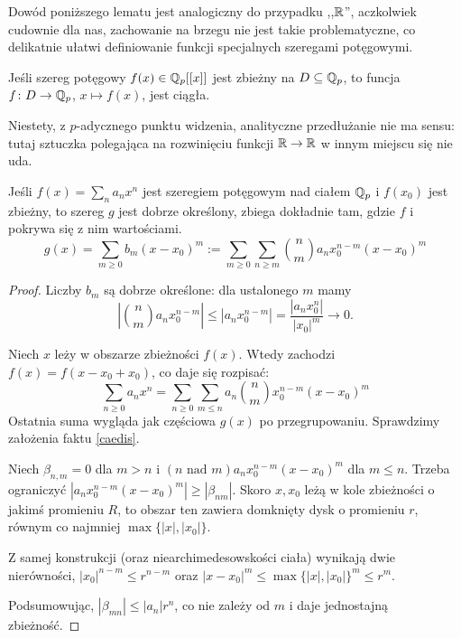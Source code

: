 Dowód  poniższego lematu jest analogiczny do przypadku ,,$\mathbb R$'', aczkolwiek cudownie dla nas, zachowanie na brzegu nie jest takie problematyczne, co delikatnie ułatwi definiowanie funkcji specjalnych szeregami potęgowymi.

\begin{lemat} \label{stummeschreie}
	Jeśli szereg potęgowy $f(x) \in \mathbb Q_p[[x]]$ jest zbieżny na $D \subseteq \mathbb Q_p$, to funcja $f \colon D \to \mathbb Q_p$, $x \mapsto f(x)$, jest ciągła.
\end{lemat}

Niestety, z $p$-adycznego punktu widzenia, analityczne przedłużanie nie ma sensu: tutaj sztuczka polegająca na rozwinięciu funkcji $\mathbb R \to \mathbb R$ w innym miejscu się nie uda.

\begin{fakt}
	Jeśli $f(x) = \sum_n a_n x^n$ jest szeregiem potęgowym nad ciałem $\mathbb Q_p$ i $f(x_0)$ jest zbieżny, to szereg $g$ jest dobrze określony, zbiega dokładnie tam, gdzie $f$ i pokrywa się z nim wartościami.
	\[
		g(x) = \sum_{m \ge 0} b_m (x - x_0)^m := \sum_{m \ge 0} \sum_{n \ge m} {n \choose m} a_n x_0^{n-m} (x-x_0)^m
	\]
\end{fakt}

\begin{proof}
	Liczby $b_m$ są dobrze określone: dla ustalonego $m$ mamy
	\[
		\left|{n \choose m} a_n x_0^{n-m}\right| \le |a_n x_0^{n-m}| = \frac{|a_nx_0^n|}{|x_0|^m} \to 0.
	\]

	Niech $x$ leży w obszarze zbieżności $f(x)$.
	Wtedy zachodzi $f(x) = f(x - x_0 + x_0)$, co daje się rozpisać:
	\[
		\sum_{n \ge 0} a_n x^n = \sum_{n \ge 0} \sum_{m \le n} a_n  {n \choose m} x_0^{n-m} (x-x_0)^m
	\]
	Ostatnia suma wygląda jak częściowa $g(x)$ po przegrupowaniu.
	Sprawdzimy założenia faktu \ref{caedis}.

	Niech $\beta_{n, m} = 0$ dla $m > n$ i $(n \textrm{ nad } m )a_n x_0^{n-m}(x - x_0)^m$ dla $m \le n$.
	Trzeba ograniczyć $|a_n x_0^{n-m} (x - x_0)^m| \ge |\beta_{nm}|$.
	Skoro $x, x_0$ leżą w kole zbieżności o jakimś promieniu $R$, to obszar ten zawiera domknięty dysk o promieniu $r$, równym co najmniej $\max \{|x|, |x_0|\}$.

	Z samej konstrukcji (oraz niearchimedesowskości ciała) wynikają dwie nierówności, $|x_0|^{n-m} \le r^{n-m}$ oraz $|x - x_0|^m \le \max \{|x|, |x_0|\}^m \le r^m$.

	Podsumowując, $|\beta_{mn}| \le |a_n| r^n$, co nie zależy od $m$ i daje jednostajną zbieżność.
\end{proof}

